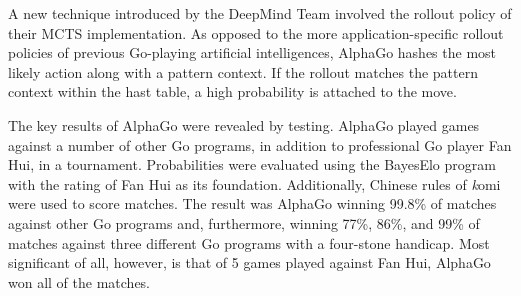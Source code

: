 \documentclass[12pt]{article}
\begin{document}
A new technique introduced by the DeepMind Team involved the rollout policy
of their MCTS implementation. As opposed to the more application-specific
rollout policies of previous Go-playing artificial intelligences, AlphaGo
hashes the most likely action along with a pattern context. If the rollout
matches the pattern context within the hast table, a high probability is
attached to the move.

The key results of AlphaGo were revealed by testing. AlphaGo played games
against a number of other Go programs, in addition to professional Go player
Fan Hui, in a tournament. Probabilities were evaluated using the BayesElo
program with the rating of Fan Hui as its foundation. Additionally, Chinese
rules of {\emph komi} were used to score matches. The result was AlphaGo
winning 99.8\% of matches against other Go programs and, furthermore, winning
77\%, 86\%, and 99\% of matches against three different Go programs with a 
four-stone handicap. Most significant of all, however, is that of 5 games
played against Fan Hui, AlphaGo won all of the matches.
\end{document}
